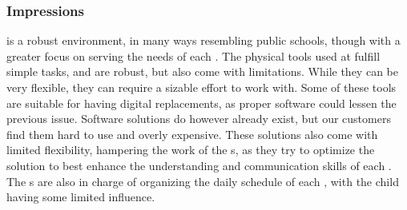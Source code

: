 \subsubsection{Impressions}
\egebakken{} is a robust environment, in many ways resembling public schools, though with a greater focus on serving the needs of each \autist[]. 
The physical tools used at \egebakken{} fulfill simple tasks, and are robust, but also come with limitations. 
While they can be very flexible, they can require a sizable effort to work with. 
Some of these tools are suitable for having digital replacements, as proper software could lessen the previous issue. 
Software solutions do however already exist, but our customers find them hard to use and overly expensive. 
These solutions also come with limited flexibility, hampering the work of the \guardian[]s, as they try to optimize the solution to best enhance the understanding and communication skills of each \autist[]. 
The \guardian[]s are also in charge of organizing the daily schedule of each \autist[], with the child having some limited influence. 

